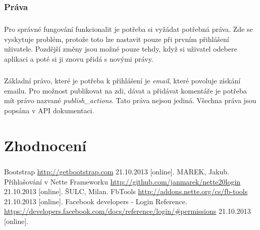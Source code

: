 \documentclass[11pt,a4paper,titlepage,oneside]{book}
\begin{document}
			\subsection{Práva}
				\paragraph{} Pro správné fungování funkcionalit je potřeba si vyžádat potřebná  práva. Zde se vyskytuje problém, protože toto lze nastavit pouze při prvním přihlášení uživatele. Pozdější změny jsou možné pouze tehdy, když si uživatel odebere aplikaci a poté si ji znovu přidá s novými právy.
				\paragraph{} Základní právo, které je potřeba k přihlášení je \textit{email}, které povoluje získání emailu. Pro možnost publikovat na zdi, dávat  a přidávat komentáře je potřeba mít právo nazvané \textit{publish\_actions}. Tato práva nejsou jediná. Všechna práva jsou popsána v API dokumentaci\cite{FbApiPrava}.

	\chapter{Zhodnocení}
		\paragraph{}

\newpage
{}
\begin{thebibliography}{50}
	Bootstrap \url{http://getbootstrap.com} 21.10.2013 [online].
	MAREK, Jakub. Přihlašování v Nette Frameworku \url{http://github.com/janmarek/nette20login} 21.10.2013 [online].
	 ŠULC, Milan. FbTools \url{http://addons.nette.org/cs/fb-tools} 21.10.2013 [online].
	 Facebook developers - Login Reference. \url{https://developers.facebook.com/docs/reference/login/#permissions} 21.10.2013 [online].
\end{thebibliography}
\end{document}
